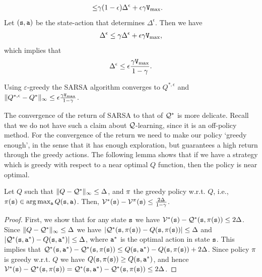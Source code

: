 \begin{advanced}
\begin{align*}
  \leq & 
   \gamma(1-\epsilon) \Delta^\epsilon+\epsilon\gamma {\tt V}_{\max }.
\end{align*}
Let $({\tt s},{\tt a})$ be the state-action that determines $\Delta^\epsilon$. Then we have
\[
\Delta^\epsilon \leq   \gamma \Delta^\epsilon+\epsilon\gamma {\tt V}_{\max },
\]
which implies that 
\[
\Delta^\epsilon \leq \epsilon \frac{\gamma{\tt V}_{\max }}{1-\gamma}.
\]
\begin{theorem}
Using $\varepsilon$-greedy the SARSA algorithm converges to     $Q^{*,\epsilon}$ and $\|Q^{*,\epsilon} -Q^{*}\|_\infty\leq \epsilon \frac{\gamma{\tt V}_{\max }}{1-\gamma}$.
\end{theorem}


The convergence of the return of SARSA to that of $\mathcal{Q}^*$ is more
delicate. Recall that we do not have such a claim about
$\mathcal{Q}$-learning, since it is an off-policy method. For the convergence
of the return we need to make our policy `greedy enough', in the
sense that it has enough exploration, but guarantees a high return
through the greedy actions. The following lemma shows that if we
have a strategy which is greedy with respect to a near optimal $Q$
function, then the policy is near optimal.

\begin{lemma}
\label{lemma:Q-greedy-policy}
%
Let $Q$ such that $\| Q-\mathcal{Q}^*\|_\infty \leq \Delta$, and $\pi$ the
greedy policy w.r.t. $Q$, i.e., $\pi({\tt s})\in \arg\max_{\tt a}
Q({\tt s},{\tt a})$. Then,
$\mathcal{V}^*({\tt s})-\mathcal{V}^\pi({\tt s})\leq
\frac{2\Delta}{1-\gamma}$.
\end{lemma}
\begin{proof}
First, we show that for any state ${\tt s}$ we have
$\mathcal{V}^*({\tt s})-\mathcal{Q}^*({\tt s},\pi({\tt s}))\leq 2\Delta$. Since
$\| Q-\mathcal{Q}^*\|_\infty \leq \Delta$ we have
$|\mathcal{Q}^*({\tt s},\pi({\tt s}))-Q({\tt s},\pi({\tt s}))|\leq \Delta$
and $|\mathcal{Q}^*({\tt s},{\tt a}^*)-Q({\tt s},{\tt a}^*)|\leq \Delta$, where
${\tt a}^*$ is the optimal action in state ${\tt s}$. This implies that
%
$\mathcal{Q}^*({\tt s},{\tt a}^*)-\mathcal{Q}^*({\tt s},\pi({\tt s}))\leq
Q({\tt s},{\tt a}^*)-Q({\tt s},\pi({\tt s}))+2\Delta$.
%
Since policy $\pi$ is greedy w.r.t. $Q$ we have
$Q({\tt s},\pi({\tt s}))\geq Q({\tt s},{\tt a}^*)$, and hence
$\mathcal{V}^*({\tt s})-\mathcal{Q}^*({\tt s},\pi({\tt s}))=\mathcal{Q}^*({\tt s},{\tt a}^*)-\mathcal{Q}^*({\tt s},\pi({\tt s}))\leq
2\Delta$.



\end{proof}
\end{advanced}
